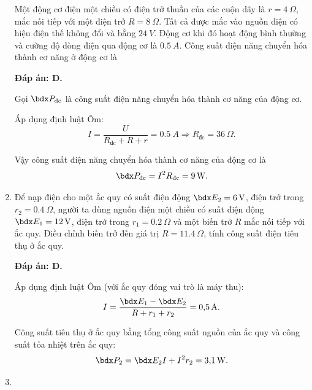 \begin{enumerate}[label=\bfseries Câu \arabic*:]
	\cauhoi
	{Một động cơ điện một chiều có điện trở thuần của các cuộn dây là $r=\SI{4}{\Omega}$, mắc nối tiếp với một điện trở $R=\SI{8}{\Omega}$. Tất cả được mắc vào nguồn điện có hiệu điện thế không đổi và bằng $\SI{24}{V}$. Động cơ khi đó hoạt động bình thường và cường độ dòng điện qua động cơ là $\SI{0.5}{A}$. Công suất điện năng chuyển hóa thành cơ năng ở động cơ là
		
	}
	\loigiai
	{	\textbf{Đáp án: D.}
		
		Gọi $\calP_\text{đc}$ là công suất điện năng chuyển hóa thành cơ năng của động cơ.
		
		Áp dụng định luật Ôm:
		$$I=\dfrac{U}{R_\text{đc} + R + r} = \SI{0.5}{A} \Rightarrow R_\text{đc} = \SI{36}{\Omega}.$$
		
		Vậy công suất điện năng chuyển hóa thành cơ năng của động cơ là
		$$\calP_\text{đc} = I^2 R_\text{đc} = \SI{9}{W}.$$
	}
	\item {}
	
	\cauhoi
	{Để nạp điện cho một ắc quy có suất điện động $\calE_2 = \SI{6}{V}$, điện trở trong $r_2 = \SI{0.4}{\Omega}$, người ta dùng nguồn điện một chiều có suất điện động $\calE_1 = \SI{12}{V}$, điện trở trong $r_1=\SI{0.2}{\Omega}$ và một biến trở $R$ mắc nối tiếp với ắc quy. Điều chỉnh biến trở đến giá trị $R=\SI{11.4}{\Omega}$, tính công suất điện tiêu thụ ở ắc quy.
		
	}
	\loigiai
	{	\textbf{Đáp án: D.}
		
		Áp dụng định luật Ôm (với ắc quy đóng vai trò là máy thu):
		$$I=\dfrac{\calE_1 - \calE_2}{R + r_1 + r_2} = \SI{0.5}{A}.$$
		
		Công suất tiêu thụ ở ắc quy bằng tổng công suất nguồn của ắc quy và công suất tỏa nhiệt trên ắc quy:
		$$\calP_2 = \calE_2 I + I^2 r_2 = \SI{3.1}{W}.$$
	}
	\item {}
	

\end{enumerate}
